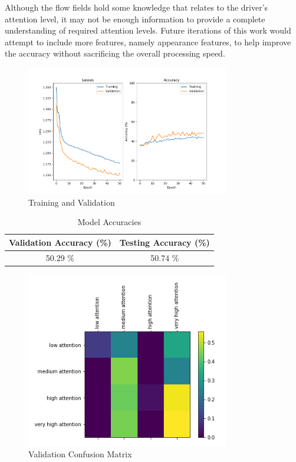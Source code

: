 \documentclass[10pt, conference, compsocconf]{IEEEtran}
\begin{document}
Although the flow fields hold some knowledge that relates to the driver's attention level, it may not be enough information to provide a complete understanding of required attention levels. Future iterations of this work would attempt to include more features, namely appearance features, to help improve the accuracy without sacrificing the overall processing speed. 

\begin{figure}[!t]
\centering
\includegraphics[width=3.5in]{images/plot}
\caption{Training and Validation}
\label{plot}
\end{figure}

\begin{table}[!t]
\renewcommand{\arraystretch}{1.3}
\caption{Model Accuracies}
\label{accuracy}
\centering
\begin{tabular}{|c|c|}
\hline
Validation Accuracy (\%) & Testing Accuracy (\%) \\
\hline
50.29 \% & 50.74 \%\\
\hline
\end{tabular}
\end{table}

\begin{figure}[!t]
\centering
\includegraphics[width=3.5in]{images/matrix}
\caption{Validation Confusion Matrix}
\label{matrix}
\end{figure}
\end{document}
